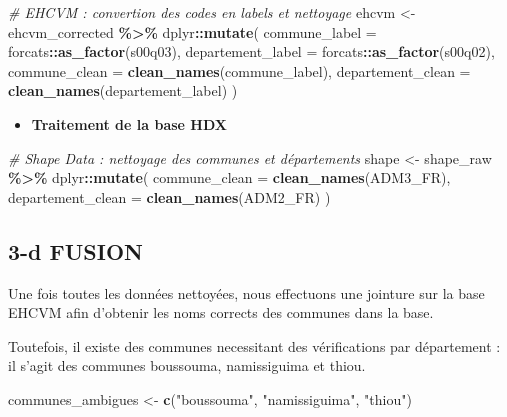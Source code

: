\documentclass[
]{article}
\newenvironment{Shaded}{\begin{snugshade}}{\end{snugshade}}
\newcommand{\AttributeTok}[1]{\textcolor[rgb]{0.13,0.29,0.53}{#1}}
\newcommand{\CommentTok}[1]{\textcolor[rgb]{0.56,0.35,0.01}{\textit{#1}}}
\newcommand{\FunctionTok}[1]{\textcolor[rgb]{0.13,0.29,0.53}{\textbf{#1}}}
\newcommand{\NormalTok}[1]{#1}
\newcommand{\OtherTok}[1]{\textcolor[rgb]{0.56,0.35,0.01}{#1}}
\newcommand{\SpecialCharTok}[1]{\textcolor[rgb]{0.81,0.36,0.00}{\textbf{#1}}}
\newcommand{\StringTok}[1]{\textcolor[rgb]{0.31,0.60,0.02}{#1}}
\providecommand{\tightlist}{%
  \setlength{\itemsep}{0pt}\setlength{\parskip}{0pt}}
\begin{document}
\begin{Shaded}
\begin{Highlighting}[]
\CommentTok{\# EHCVM : convertion des codes en labels et nettoyage}
\NormalTok{ehcvm }\OtherTok{\textless{}{-}}\NormalTok{ ehcvm\_corrected }\SpecialCharTok{\%\textgreater{}\%}
\NormalTok{  dplyr}\SpecialCharTok{::}\FunctionTok{mutate}\NormalTok{(}
    \AttributeTok{commune\_label =}\NormalTok{ forcats}\SpecialCharTok{::}\FunctionTok{as\_factor}\NormalTok{(s00q03),}
    \AttributeTok{departement\_label =}\NormalTok{ forcats}\SpecialCharTok{::}\FunctionTok{as\_factor}\NormalTok{(s00q02),}
    \AttributeTok{commune\_clean =} \FunctionTok{clean\_names}\NormalTok{(commune\_label),}
    \AttributeTok{departement\_clean =} \FunctionTok{clean\_names}\NormalTok{(departement\_label)}
\NormalTok{  )}
\end{Highlighting}
\end{Shaded}

\begin{itemize}
\tightlist
\item
  \textbf{Traitement de la base HDX}
\end{itemize}

\begin{Shaded}
\begin{Highlighting}[]
\CommentTok{\# Shape Data : nettoyage des communes et départements}
\NormalTok{shape }\OtherTok{\textless{}{-}}\NormalTok{ shape\_raw }\SpecialCharTok{\%\textgreater{}\%}
\NormalTok{  dplyr}\SpecialCharTok{::}\FunctionTok{mutate}\NormalTok{(}
    \AttributeTok{commune\_clean =} \FunctionTok{clean\_names}\NormalTok{(ADM3\_FR),}
    \AttributeTok{departement\_clean =} \FunctionTok{clean\_names}\NormalTok{(ADM2\_FR)}
\NormalTok{  )}
\end{Highlighting}
\end{Shaded}

\subsection{3-d FUSION}\label{d-fusion}

Une fois toutes les données nettoyées, nous effectuons une jointure sur
la base EHCVM afin d'obtenir les noms corrects des communes dans la
base.

Toutefois, il existe des communes necessitant des vérifications par
département : il s'agit des communes boussouma, namissiguima et thiou.

\begin{Shaded}
\begin{Highlighting}[]
\NormalTok{communes\_ambigues }\OtherTok{\textless{}{-}} \FunctionTok{c}\NormalTok{(}\StringTok{"boussouma"}\NormalTok{, }\StringTok{"namissiguima"}\NormalTok{, }\StringTok{"thiou"}\NormalTok{)}
\end{Highlighting}
\end{Shaded}
\end{document}
